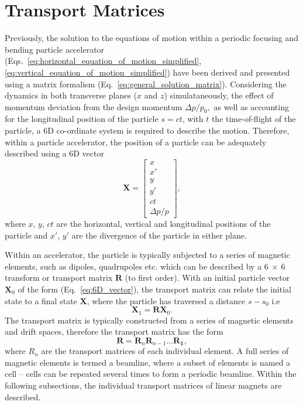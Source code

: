 \documentclass[../main.tex]{subfiles}
\begin{document}
\section{Transport Matrices} 

Previously, the solution to the equations of motion within a periodic focusing and bending particle accelerator (Eqs.~\ref{eq:horizontal_equation_of_motion_simplified}, \ref{eq:vertical_equation_of_motion_simplified}) have been derived and presented using a matrix formalism (Eq.~\ref{eq:general_solution_matrix}). Considering the dynamics in both transverse planes ($x$ and $z$) simulataneously, the effect of momentum deviation from the design momentum $\Delta p/p_{0},$ as well as accounting for the longitudinal position of the particle $s=ct$, with $t$ the time-of-flight of the particle, a 6D co-ordinate system is required to describe the motion. Therefore, within a particle accelerator, the position of a particle can be adequately described using a 6D vector 
\begin{equation}
\boldsymbol{X} = 
\begin{bmatrix}
x \\
x' \\
y \\
y' \\
ct \\
\Delta p/p
\end{bmatrix},
\label{eq:6D_vector}
\end{equation}
where $x$, $y$, $ct$ are the horizontal, vertical and longitudinal positions of the particle and $x'$, $y'$ are the divergence of the particle in either plane.

Within an accelerator, the particle is typically subjected to a series of magnetic elements, such as dipoles, quadrupoles etc. which can be described by a $6~\times~6$ transform or transport matrix $\boldsymbol{R}$ (to first order). With an initial particle vector $\boldsymbol{X}_{0}$ of the form (Eq.~\ref{eq:6D_vector}), the transport matrix can relate the initial state to a final state $\boldsymbol{X}$, where the particle has traversed a distance $s-s_{0}$ i.e
\begin{equation}
\boldsymbol{X}_{1} = \boldsymbol{R}\boldsymbol{X}_{0}.
\label{eq:overall_transport_matrix}
\end{equation}
The transport matrix is typically constructed from a series of magnetic elements and drift spaces, therefore the transport matrix has the form
\begin{equation}
\boldsymbol{R} = \boldsymbol{R}_{n}\boldsymbol{R}_{n-1}\ldots\boldsymbol{R_{1}},
\label{eq:subseries_transport_matrix}    
\end{equation}
where $R_{n}$ are the transport matrices of each individual element. A full series of magnetic elements is termed a beamline, where a subset of elements is named a cell -- cells can be repeated several times to form a periodic beamline. Within the following subsections, the individual transport matrices of linear magnets are described. 
\end{document}
